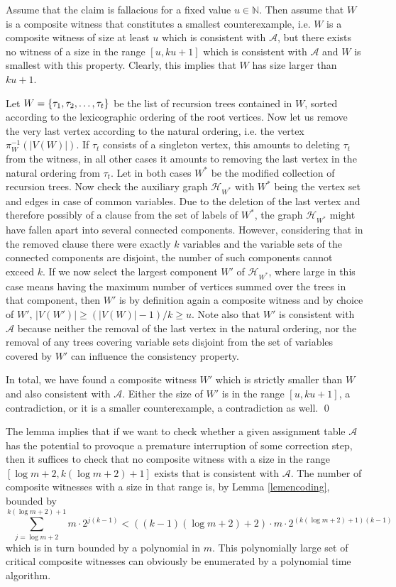 \documentclass[11pt,a4paper]{article}
\begin{document}
\proof Assume that the claim is fallacious for a fixed value $u \in \mathbb{N}$. Then assume that $W$ is a composite witness
that constitutes a smallest counterexample, i.e. $W$ is a composite witness of size at least $u$ which is consistent with
$\mathcal{A}$, but there exists no witness of a size in the range $[u,ku+1]$ which is consistent with $\mathcal{A}$ and $W$ is smallest with this property. Clearly,
this implies that $W$ has size larger than $ku+1$.

Let $W = \{ \tau_1, \tau_2, \mathellipsis, \tau_t \}$ be the list of recursion trees contained in $W$, sorted according
to the lexicographic ordering of the root vertices. Now let us remove the very last vertex according to the natural ordering,
i.e. the vertex $\pi_W^{-1}(|V(W)|)$. If $\tau_t$ consists of a singleton vertex, this amounts to deleting $\tau_t$ from the
witness, in all other cases it amounts to removing the last vertex in the natural ordering from $\tau_t$. Let in both
cases $W^*$ be the modified collection of recursion trees. Now check the auxiliary graph $\mathcal{H}_{W^*}$ with $W^*$
being the vertex set and edges in case of common variables. Due to the deletion of the last vertex and therefore possibly of
a clause from the set of labels of $W^*$, the graph $\mathcal{H}_{W^*}$ might have fallen apart into several
connected components. However, considering that in the removed clause there were exactly $k$ variables and the variable sets
of the connected components are disjoint, the number of such components cannot exceed $k$. If we now select the largest
component $W'$ of $\mathcal{H}_{W^*}$, where large in this case means having the maximum number of vertices summed over the
trees in that component, then $W'$ is by definition again a composite witness and by choice of $W'$, $|V(W')| \ge (|V(W)|-1)/k \ge u$.
Note also that $W'$ is consistent with $\mathcal{A}$ because neither the removal of the last vertex in the natural ordering,
nor the removal of any trees covering variable sets disjoint from the set of variables covered by $W'$ can influence
the consistency property.

In total, we have found a composite witness $W'$ which is strictly smaller than $W$ and also consistent with $\mathcal{A}$.
Either the size of $W'$ is in the range $[u,ku+1]$, a contradiction, or it is a smaller counterexample, a contradiction as
well. \qed

The lemma implies that if we want to check whether a given assignment table $\mathcal{A}$ has the potential to provoque a premature
interruption of some correction step, then it suffices to check that no composite witness with a size in the range 
$[\log m + 2, k(\log m + 2) + 1]$ exists that is consistent with $\mathcal{A}$. The number of composite witnesses with a size in
that range is, by Lemma \ref{lemencoding}, bounded by
$$\sum_{j=\log m + 2}^{k(\log m + 2) + 1} m \cdot 2^{j(k-1)} < ((k-1)(\log m + 2) + 2) \cdot m \cdot 2^{(k(\log m + 2) + 1)(k-1)}$$
which is in turn bounded by a polynomial in $m$. This polynomially large set of critical composite witnesses can obviously
be enumerated by a polynomial time algorithm.
\end{document}
